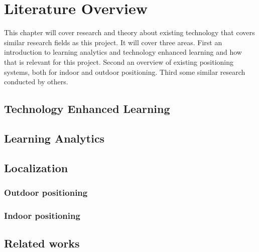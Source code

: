 \documentclass[../Main/thesis.tex]{subfiles}
\begin{document}
\chapter{Literature Overview}
\label{ch:literature_overview}
This chapter will cover research and theory about existing technology that covers similar research fields as this project. 
It will cover three areas.
First an introduction to learning analytics and technology enhanced learning and how that is relevant for this project.
Second an overview of existing positioning systems, both for indoor and outdoor positioning.
Third some similar research conducted by others.

\section{Technology Enhanced Learning}


\section{Learning Analytics} 


\section{Localization}

\subsection{Outdoor positioning}

\subsection{Indoor positioning}

\section{Related works}
\end{document}
